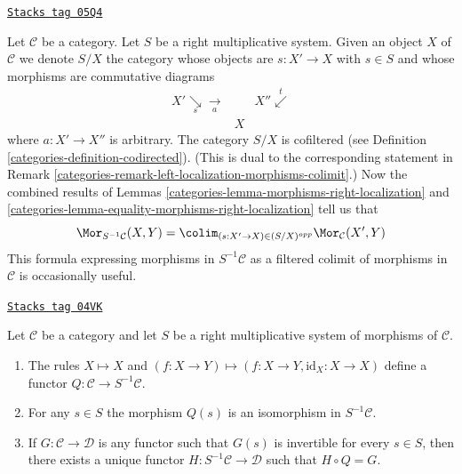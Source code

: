 \begin{remark}
\label{categories-remark-right-localization-morphisms-colimit}
\href{https://stacks.math.columbia.edu/tag/05Q4}{\texttt{Stacks tag 05Q4}}

Let $\mathcal{C}$ be a category. Let $S$ be a right multiplicative system.
Given an object $X$ of $\mathcal{C}$ we denote $S/X$ the category whose
objects are $s : X' \to X$ with $s \in S$ and whose morphisms are
commutative diagrams
$$
\begin{array}{ccc}X' \underset{s}{\searrow}\underset{a}{\longrightarrow} &  & X'' \overset{t}{\swarrow} \\  & X & \end{array}
$$
where $a : X' \to X''$ is arbitrary. The category
$S/X$ is cofiltered (see
Definition \ref{categories-definition-codirected}).
(This is dual to the corresponding statement in
Remark \ref{categories-remark-left-localization-morphisms-colimit}.)
Now the combined results of
Lemmas \ref{categories-lemma-morphisms-right-localization} and
\ref{categories-lemma-equality-morphisms-right-localization}
tell us that
\begin{equation}
\label{equation-right-localization-morphisms-colimit}
\Mor_{S^{-1}\mathcal{C}}(X, Y) =
\colim_{(s : X' \to X) \in (S/X)^{opp}} \Mor_\mathcal{C}(X', Y)
\end{equation}
This formula expressing morphisms in $S^{-1}\mathcal{C}$ as a filtered
colimit of morphisms in $\mathcal{C}$ is occasionally useful.
\end{remark}

\begin{lemma}
\label{categories-lemma-properties-right-localization}
\href{https://stacks.math.columbia.edu/tag/04VK}{\texttt{Stacks tag 04VK}}

Let $\mathcal{C}$ be a category and let $S$ be a right multiplicative
system of morphisms of $\mathcal{C}$.
\begin{enumerate}
\item The rules $X \mapsto X$ and
$(f : X \to Y) \mapsto (f : X \to Y, \text{id}_X : X \to X)$
define a functor $Q : \mathcal{C} \to S^{-1}\mathcal{C}$.
\item For any $s \in S$ the morphism $Q(s)$ is an isomorphism in
$S^{-1}\mathcal{C}$.
\item If $G : \mathcal{C} \to \mathcal{D}$ is any functor such that
$G(s)$ is invertible for every $s \in S$, then there exists a
unique functor $H : S^{-1}\mathcal{C} \to \mathcal{D}$
such that $H \circ Q = G$.
\end{enumerate}
\end{lemma}

